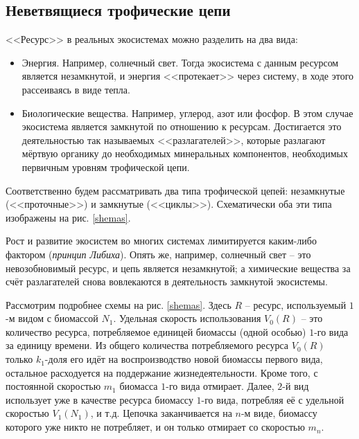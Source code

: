 \subsection{Неветвящиеся трофические цепи}
<<Ресурс>> в реальных экосистемах можно разделить на два вида:
\begin{itemize}
    \item Энергия. Например, солнечный свет. Тогда экосистема с данным ресурсом является незамкнутой, и энергия <<протекает>> через систему, в ходе этого рассеиваясь в виде тепла.
    \item Биологические вещества. Например, углерод, азот или фосфор. В этом случае экосистема является замкнутой по отношению к ресурсам. Достигается это деятельностью так называемых <<разлагателей>>, которые разлагают мёртвую органику до необходимых минеральных компонентов, необходимых первичным уровням трофической цепи.
\end{itemize}

Соответственно будем рассматривать два типа трофической цепей: незамкнутые (<<проточные>>) и замкнутые (<<циклы>>). Схематически оба эти типа изображены на рис. \ref{shemas}.

Рост и развитие экосистем во многих системах лимитируется каким-либо фактором (\textit{принцип Либиха}). Опять же, например, солнечный свет -- это невозобновимый ресурс, и цепь является незамкнутой; а химические вещества за счёт разлагателей снова вовлекаются в деятельность замкнутой экосистемы.

Рассмотрим подробнее схемы на рис. \ref{shemas}. Здесь \(R\) -- ресурс, используемый \(1\)-м видом с биомассой \(N_1\). Удельная скорость использования \(V_0(R)\) -- это количество ресурса, потребляемое единицей биомассы (одной особью) \(1\)-го вида за единицу времени. Из общего количества потребляемого ресурса \(V_0(R)\) только \(k_1\)-доля его идёт на воспроизводство новой биомассы первого вида, остальное расходуется на поддержание жизнедеятельности. Кроме того, с постоянной скоростью \(m_1\) биомасса \(1\)-го вида отмирает. Далее, \(2\)-й вид использует уже в качестве ресурса биомассу \(1\)-го вида, потребляя её с удельной скоростью \(V_1(N_1)\), и т.д. Цепочка заканчивается на \(n\)-м виде, биомассу которого уже никто не потребляет, и он только отмирает со скоростью \(m_n\).

